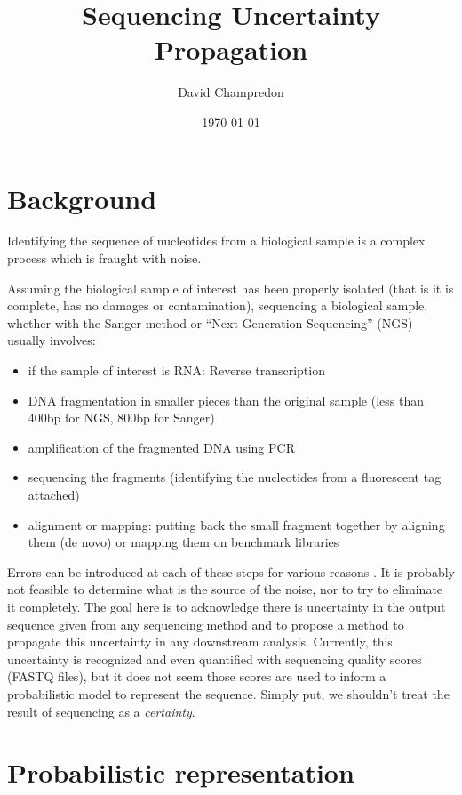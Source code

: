 \documentclass[12pt]{article}
\title{Sequencing Uncertainty Propagation}
\author{David Champredon}
\date{\today}                                           %
\begin{document}
\maketitle

\section{Background}

Identifying the sequence of nucleotides from a biological sample is a complex process which is fraught with noise. 

Assuming the biological sample of interest has been properly isolated (that is it is complete, has no damages or contamination), sequencing a biological sample, whether with the Sanger method or ``Next-Generation Sequencing'' (NGS) usually involves:
\begin{itemize}
\item if the sample of interest is RNA: Reverse transcription 
\item DNA fragmentation in smaller pieces than the original sample (less than 400bp for NGS, 800bp for Sanger)
\item amplification of the fragmented DNA using PCR
\item sequencing the fragments (identifying the nucleotides from a fluorescent tag attached)
\item alignment or mapping: putting back the small fragment together by aligning them (de novo) or mapping them on benchmark libraries
\end{itemize}


Errors can be introduced at each of these steps for various reasons \cite{Beerenwinkel:2011}. It is probably not feasible to determine what is the source of the noise, nor to try to eliminate it completely.
The goal here is to acknowledge there is uncertainty in the output sequence given from any sequencing method and to propose a method to propagate this uncertainty in any downstream analysis.
Currently, this uncertainty is recognized and even quantified with sequencing quality scores (FASTQ files), but it does not seem those scores are used to inform a probabilistic model to represent the sequence. 
Simply put, we shouldn't treat the result of sequencing as a \emph{certainty}.




\section{Probabilistic representation}
\end{document}

